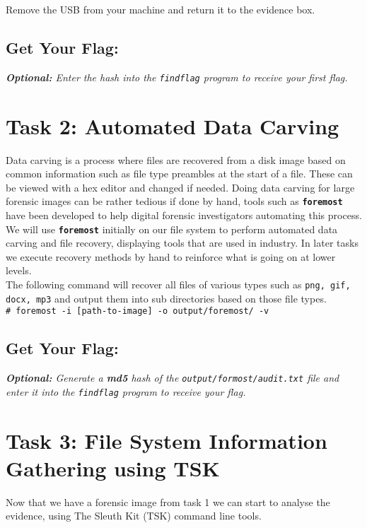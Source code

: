 \documentclass[a4paper,11pt]{article}
\begin{document}
\noindent
Remove the USB from your machine and return it to the evidence box.

\subsection*{Get Your Flag:}
\noindent
\textit{\textbf{Optional:} Enter the hash into the \texttt{findflag} program to receive your first flag.}

\section{Task 2: Automated Data Carving}\label{sec:task2-auto-data-carving}
Data carving is a process where files are recovered from a disk image based on common information such as file type preambles at the start of a file. These can be viewed with a hex editor and changed if needed. Doing data carving for large forensic images can be rather tedious if done by hand, tools such as \texttt{\textbf{foremost}} have been developed to help digital forensic investigators automating this process. 
\\

We will use \texttt{\textbf{foremost}} initially on our file system to perform automated data carving and file recovery, displaying tools that are used in industry. In later tasks we execute recovery methods by hand to reinforce what is going on at lower levels.
\\

The following command will recover all files of various types such as \texttt{png, gif, docx, mp3} and output them into sub directories based on those file types.
\\

\noindent
\verb|# foremost -i [path-to-image] -o output/foremost/ -v|
\subsection*{Get Your Flag:}
\noindent
\textit{\textbf{Optional:} Generate a \textbf{\textit{md5}} hash of the \texttt{output/formost/audit.txt} file and enter it into the \texttt{findflag} program to receive your flag.}

\section{Task 3: File System Information Gathering using TSK}\label{sec:task3-fs-info-gathering}
Now that we have a forensic image from task 1 we can start to analyse the evidence, using The Sleuth Kit (TSK) command line tools.
\end{document}
